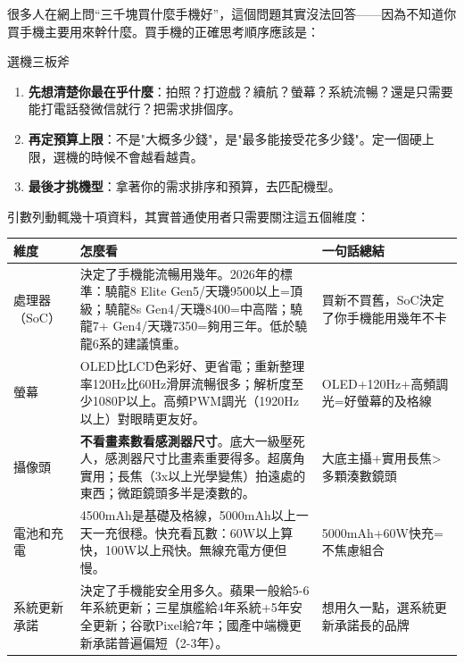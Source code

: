 


很多人在網上問“三千塊買什麼手機好”，這個問題其實沒法回答——因為不知道你買手機主要用來幹什麼。買手機的正確思考順序應該是：

\begin{tcbinfo}{選機三板斧}
\begin{enumerate}
  \item \textbf{先想清楚你最在乎什麼}：拍照？打遊戲？續航？螢幕？系統流暢？還是只需要能打電話發微信就行？把需求排個序。
  \item \textbf{再定預算上限}：不是"大概多少錢"，是"最多能接受花多少錢"。定一個硬上限，選機的時候不會越看越貴。
  \item \textbf{最後才挑機型}：拿著你的需求排序和預算，去匹配機型。
\end{enumerate}

\end{tcbinfo}


引數列動輒幾十項資料，其實普通使用者只需要關注這五個維度：

\begin{center}
\begin{tabularx}{\linewidth}{|X|X|X|}
\hline
\textbf{維度} & \textbf{怎麼看} & \textbf{一句話總結} \tabularnewline
\hline
處理器（SoC） & 決定了手機能流暢用幾年。2026年的標準：驍龍8 Elite Gen5/天璣9500以上=頂級；驍龍8s Gen4/天璣8400=中高階；驍龍7+ Gen4/天璣7350=夠用三年。低於驍龍6系的建議慎重。 & 買新不買舊，SoC決定了你手機能用幾年不卡 \tabularnewline
螢幕 & OLED比LCD色彩好、更省電；重新整理率120Hz比60Hz滑屏流暢很多；解析度至少1080P以上。高頻PWM調光（1920Hz以上）對眼睛更友好。 & OLED+120Hz+高頻調光=好螢幕的及格線 \tabularnewline
攝像頭 & \textbf{不看畫素數看感測器尺寸}。底大一級壓死人，感測器尺寸比畫素重要得多。超廣角實用；長焦（3x以上光學變焦）拍遠處的東西；微距鏡頭多半是湊數的。 & 大底主攝+實用長焦>多顆湊數鏡頭 \tabularnewline
電池和充電 & 4500mAh是基礎及格線，5000mAh以上一天一充很穩。快充看瓦數：60W以上算快，100W以上飛快。無線充電方便但慢。 & 5000mAh+60W快充=不焦慮組合 \tabularnewline
系統更新承諾 & 決定了手機能安全用多久。蘋果一般給5-6年系統更新；三星旗艦給4年系統+5年安全更新；谷歌Pixel給7年；國產中端機更新承諾普遍偏短（2-3年）。 & 想用久一點，選系統更新承諾長的品牌 \tabularnewline
\hline
\end{tabularx}
\end{center}

